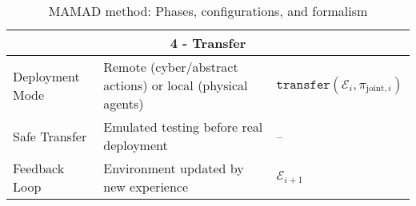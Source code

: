 \begin{table}[h!]
\begin{footnotesize}
\begin{tabular}{|p{2cm}|p{6cm}|p{3cm}|}
            \multicolumn{3}{|c|}{\textbf{4 - Transfer}}                                                                                                                                                                                                                                    \\ \hline
            Deployment Mode               & Remote (cyber/abstract actions) or local (physical agents)                     & $\texttt{transfer}(\mathcal{E}_i, \pi_{\text{joint}, i})$                                                                                                     \\ \hline
            Safe Transfer                 & Emulated testing before real deployment                                        & --                                                                                                                                                            \\ \hline
            Feedback Loop                 & Environment updated by new experience                                          & $\mathcal{E}_{i+1}$                                                                                                                                           \\ \hline
        \end{tabular}
        \caption{MAMAD method: Phases, configurations, and formalism}
        \label{tab:mamad_table_configuration}
    \end{footnotesize}
\end{table}
